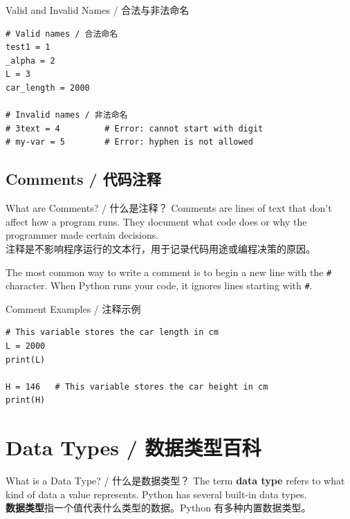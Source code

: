 \documentclass[11pt,a4paper]{article}
\begin{document}
\begin{examplebox}{Valid and Invalid Names / 合法与非法命名}
\begin{lstlisting}
# Valid names / 合法命名
test1 = 1
_alpha = 2
L = 3
car_length = 2000

# Invalid names / 非法命名
# 3text = 4         # Error: cannot start with digit
# my-var = 5        # Error: hyphen is not allowed
\end{lstlisting}
\end{examplebox}

\subsection{Comments / 代码注释}

\begin{concept}{What are Comments? / 什么是注释？}
    Comments are lines of text that don't affect how a program runs. They document what code does or why the programmer made certain decisions. \\
    注释是不影响程序运行的文本行，用于记录代码用途或编程决策的原因。

    The most common way to write a comment is to begin a new line with the \texttt{\#} character. When Python runs your code, it ignores lines starting with \texttt{\#}.
\end{concept}

\begin{examplebox}{Comment Examples / 注释示例}
\begin{lstlisting}
# This variable stores the car length in cm
L = 2000
print(L)

H = 146   # This variable stores the car height in cm
print(H)
\end{lstlisting}
\end{examplebox}

\section{Data Types / 数据类型百科}

\begin{concept}{What is a Data Type? / 什么是数据类型？}
    The term \textbf{data type} refers to what kind of data a value represents. Python has several built-in data types. \\
    \textbf{数据类型}指一个值代表什么类型的数据。Python 有多种内置数据类型。
\end{concept}
\end{document}
